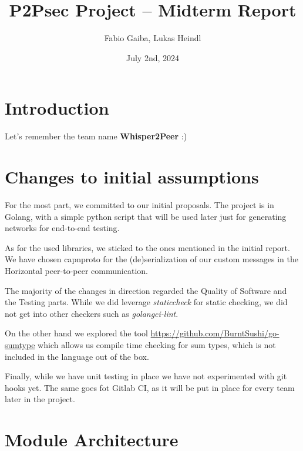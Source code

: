 \documentclass[a4paper,english,10pt,NET]{tumarticle}
\title{P2Psec Project -- Midterm Report}
\author{Fabio Gaiba, Lukas Heindl}
\date{July 2nd, 2024}
\begin{document}
\maketitle
\thispagestyle{tumarticle}

\section{Introduction}

Let's remember the team name \textbf{Whisper2Peer} :)


\section{Changes to initial assumptions}

For the most part, we committed to our initial proposals. The project is in Golang, with a simple python script that will be used later just for generating networks for end-to-end testing.


As for the used libraries, we sticked to the ones mentioned in the initial report. We have chosen capnproto for the (de)serialization of our custom messages in the Horizontal peer-to-peer communication. 

The majority of the changes in direction regarded the Quality of Software and the Testing parts. While we did leverage \textit{staticcheck} for static checking, we did not get into other checkers such as \textit{golangci-lint}. 

On the other hand we explored the tool \href{https://github.com/BurntSushi/go-sumtype}{https://github.com/BurntSushi/go-sumtype} which allows us compile time checking for sum types, which is not included in the language out of the box. 

Finally, while we have unit testing in place we have not experimented with git hooks yet. The same goes fot Gitlab CI, as it will be put in place for every team later in the project.



\section{Module Architecture}
\end{document}
